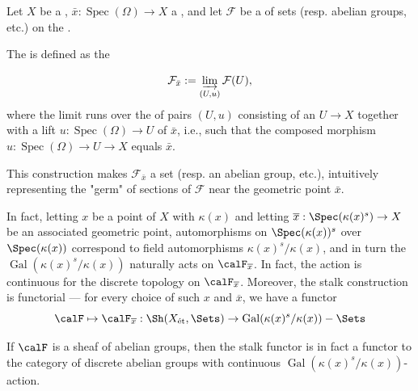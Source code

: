\begin{definition} \label{definition:stalk_of_a_presheaf_on_the_small_etale_site_of_a_schem_at_a_geometric_point}
    Let $X$ be a , $\bar{x} : \operatorname{Spec}(\Omega) \to X$ a , and let $\mathcal{F}$ be a  of sets (resp. abelian groups, etc.) on the . 

    The  is defined as the 

    $$ \mathcal{F}_{\bar{x}} := \varinjlim_{(U,u)} \mathcal{F}(U), $$
    where the limit runs over the  of pairs $(U,u)$ consisting of an  $U \to X$ together with a lift $u : \operatorname{Spec}(\Omega) \to U$ of $\bar{x}$, i.e., such that the composed morphism $u: \operatorname{Spec}(\Omega) \to U \to X$ equals $\bar{x}$.

    This construction makes $\mathcal{F}_{\bar{x}}$ a set (resp. an abelian group, etc.), intuitively representing the "germ" of sections of $\mathcal{F}$ near the geometric point $\bar{x}$. 

    In fact, letting $x$ be a point of $X$ with  $\kappa(x)$ and letting $\overline{x}: \Spec(\kappa(x)^s) \to X$ be an associated geometric point, automorphisms on $\Spec(\kappa(x))^s$ over $\Spec(\kappa(x))$ correspond to field automorphisms $\kappa(x)^s / \kappa(x)$, and in turn the  $\operatorname{Gal}(\kappa(x)^s / \kappa(x))$ naturally acts on $\calF_{\overline{x}}$. In fact, the action is continuous for the discrete topology on $\calF_{\overline{x}}$. Moreover, the stalk construction is functorial --- for every choice of such $x$ and $\overline{x}$, we have a functor 
    $$\calF \mapsto \calF_{\overline{x}}: \Sh(X_{\text{ét}}, \Sets) \to \operatorname{Gal}(\kappa(x)^s / \kappa(x))-\Sets$$

    If $\calF$ is a sheaf of abelian groups, then the stalk functor is in fact a functor to the category of discrete abelian groups with continuous $\operatorname{Gal}(\kappa(x)^s / \kappa(x))$-action.

\end{definition}